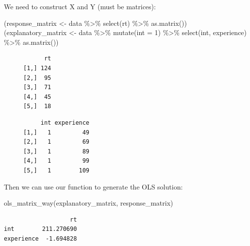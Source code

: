 \documentclass[
  letterpaper,
  DIV=11,
  numbers=noendperiod]{scrartcl}
\newenvironment{Shaded}{}{}
\newcommand{\AttributeTok}[1]{\textcolor[rgb]{0.84,0.23,0.29}{#1}}
\newcommand{\DecValTok}[1]{\textcolor[rgb]{0.00,0.36,0.77}{#1}}
\newcommand{\FunctionTok}[1]{\textcolor[rgb]{0.44,0.26,0.76}{#1}}
\newcommand{\NormalTok}[1]{\textcolor[rgb]{0.14,0.16,0.18}{#1}}
\newcommand{\OtherTok}[1]{\textcolor[rgb]{0.44,0.26,0.76}{#1}}
\newcommand{\SpecialCharTok}[1]{\textcolor[rgb]{0.00,0.36,0.77}{#1}}
\begin{document}
We need to construct X and Y (must be matrices):

\begin{Shaded}
\begin{Highlighting}[]
\NormalTok{(response\_matrix }\OtherTok{\textless{}{-}}\NormalTok{ data }\SpecialCharTok{\%\textgreater{}\%} \FunctionTok{select}\NormalTok{(rt) }\SpecialCharTok{\%\textgreater{}\%} \FunctionTok{as.matrix}\NormalTok{())}
\NormalTok{(explanatory\_matrix }\OtherTok{\textless{}{-}}\NormalTok{ data }\SpecialCharTok{\%\textgreater{}\%} \FunctionTok{mutate}\NormalTok{(}\AttributeTok{int =} \DecValTok{1}\NormalTok{) }\SpecialCharTok{\%\textgreater{}\%} \FunctionTok{select}\NormalTok{(int, experience) }\SpecialCharTok{\%\textgreater{}\%} \FunctionTok{as.matrix}\NormalTok{())}
\end{Highlighting}
\end{Shaded}

\begin{figure}

\begin{minipage}{0.50\linewidth}

\begin{verbatim}
      rt
[1,] 124
[2,]  95
[3,]  71
[4,]  45
[5,]  18
\end{verbatim}

\end{minipage}%
%
\begin{minipage}{0.50\linewidth}

\begin{verbatim}
     int experience
[1,]   1         49
[2,]   1         69
[3,]   1         89
[4,]   1         99
[5,]   1        109
\end{verbatim}

\end{minipage}%

\end{figure}%

Then we can use our function to generate the OLS solution:

\begin{Shaded}
\begin{Highlighting}[]
\FunctionTok{ols\_matrix\_way}\NormalTok{(explanatory\_matrix, response\_matrix)}
\end{Highlighting}
\end{Shaded}

\begin{verbatim}
                   rt
int        211.270690
experience  -1.694828
\end{verbatim}
\end{document}
